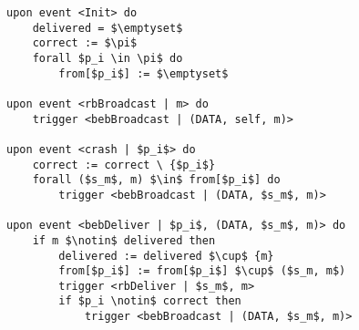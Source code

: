 \begin{lstlisting}[mathescape, caption= Lazy reliable broadcast, captionpos=b]
upon event <Init> do
    delivered = $\emptyset$
    correct := $\pi$
    forall $p_i \in \pi$ do
        from[$p_i$] := $\emptyset$

upon event <rbBroadcast | m> do
    trigger <bebBroadcast | (DATA, self, m)>

upon event <crash | $p_i$> do
    correct := correct \ {$p_i$}
    forall ($s_m$, m) $\in$ from[$p_i$] do
        trigger <bebBroadcast | (DATA, $s_m$, m)>

upon event <bebDeliver | $p_i$, (DATA, $s_m$, m)> do
    if m $\notin$ delivered then
        delivered := delivered $\cup$ {m}
        from[$p_i$] := from[$p_i$] $\cup$ ($s_m, m$)
        trigger <rbDeliver | $s_m$, m>
        if $p_i \notin$ correct then
            trigger <bebBroadcast | (DATA, $s_m$, m)>
\end{lstlisting}

